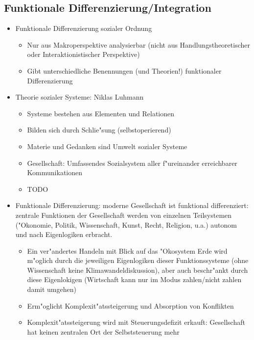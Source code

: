 \subsection{Funktionale Differenzierung/Integration}
\begin{itemize}
	\item Funktionale Differenzierung sozialer Ordnung
		\begin{itemize}
			\item
				Nur aus Makroperspektive analysierbar (nicht aus Handlungstheoretischer oder Interaktionistischer Perspektive)
			\item
				Gibt unterschiedliche Benennungen (und Theorien!) funktionaler Differenzierung
		\end{itemize}
	\item {} 
		Theorie sozialer Systeme: Niklas Luhmann
		\begin{itemize}
			\item Systeme bestehen aus Elementen und Relationen
			\item Bilden sich durch Schlie"sung (selbstoperierend)
			\item
				Materie und Gedanken sind Umwelt sozialer Systeme
			\item
				Gesellschaft: Umfassendes Sozialsystem aller f"ureinander erreichbarer Kommunikationen
			\item
				TODO
		\end{itemize}
	\item
		Funktionale Differenzierung: moderne Gesellschaft ist funktional differenziert: zentrale Funktionen der Gesellschaft werden von einzelnen Teilsystemen ("Okonomie, Politik, Wissenschaft, Kunst, Recht, Religion, u.a.) autonom und nach Eigenlogiken erbracht. 
		\begin{itemize}
			\item
				Ein ver"andertes Handeln mit Blick auf das "Okosystem Erde wird m"oglich durch die jeweiligen Eigenlogiken dieser Funktionssysteme (ohne Wissenschaft keine Klimawandeldiskussion), aber auch beschr"ankt durch diese Eigenlokigen (Wirtschaft kann nur im Modus zahlen/nicht zahlen damit umgehen)
			\item
				Erm"oglicht Komplexit"atssteigerung und Absorption von Konflikten
			\item
				Komplexit"atssteigerung wird mit Steuerungsdefizit erkauft: Gesellschaft hat keinen zentralen Ort der Selbststeuerung mehr
		\end{itemize}
\end{itemize}

